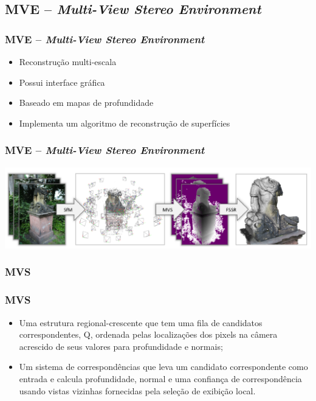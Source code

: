 \documentclass[table, usenames, svgnames, xcolor=dvipsnames]{beamer}
\begin{document}
\subsection{MVE -- \emph{Multi-View Stereo Environment}}

\begin{frame} 
\frametitle{\textbf{MVE -- \emph{Multi-View Stereo Environment}}}
	\begin{center}
		\begin{itemize}
		\item {Reconstrução multi-escala}
		\item {Possui interface gráfica}
		\item {Baseado em mapas de profundidade}
		\item {Implementa um algoritmo de reconstrução de superfícies}
		\end{itemize}
	\end{center}
\end{frame}

\begin{frame}
\frametitle{\textbf{MVE -- \emph{Multi-View Stereo Environment}}}
	\begin{center}
	 	\includegraphics[width=1\linewidth]{figs/mvepipe.png}
	\end{center}
\end{frame}

\subsubsection{MVS}

\begin{frame} 
\frametitle{\textbf{MVS}}
	\begin{center}
		\begin{itemize}
			\item {Uma estrutura regional-crescente que tem uma fila de candidatos correspondentes, Q, ordenada pelas localizações dos pixels na câmera acrescido de seus valores para profundidade e normais;}
	\item {Um sistema de correspondências que leva um candidato correspondente como entrada e calcula profundidade, normal e uma confiança de correspondência usando vistas vizinhas fornecidas pela seleção de exibição local.}
		\end{itemize}
	\end{center}
\end{frame}
\end{document}
